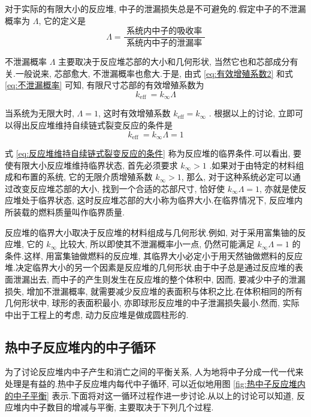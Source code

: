 \documentclass{Sichuan Normal University}
\begin{document}
对于实际的有限大小的反应堆, 中子的泄漏损失总是不可避免的.假定中子的不泄漏概率为 $\Lambda$, 它的定义是
\begin{equation}
    \Lambda=\frac{\text { 系统内中子的吸收率 }}{\text { 系统内中子的泄漏率 }}
    \label{eq:不泄漏概率}
\end{equation}

不泄漏概率 $\Lambda$ 主要取决于反应堆芯部的大小和几何形状, 当然它也和芯部成分有关.一般说来, 芯部愈大, 不泄漏概率也愈大.于是, 由式 \eqref{eq:有效增殖系数2} 和式 \eqref{eq:不泄漏概率} 可知, 有限尺寸芯部的有效增殖系数为
\begin{equation}
    k_{\text {eff }}=k_{\infty} \Lambda
    \label{eq:有效增殖系数3}
\end{equation}

当系统为无限大时, $\Lambda=1$, 这时有效增殖系数 $k_{\mathrm{eff}}=k_{\infty}$ .
根据以上的讨论, 立即可以得出反应堆维持自续链式裂变反应的条件是
\begin{equation}
    k_{\text {eff }}=k_{\infty} \Lambda=1
    \label{eq:反应堆维持自续链式裂变反应的条件}
\end{equation}

式 \eqref{eq:反应堆维持自续链式裂变反应的条件} 称为反应堆的临界条件.可以看出, 要使有限大小反应堆维持临界状态, 首先必须要求 $k_{\infty}>1$ .如果对于由特定的材料组成和布置的系统, 它的无限介质增殖系数 $k_{\infty}>1$, 那么, 对于这种系统必定可以通过改变反应堆芯部的大小, 找到一个合适的芯部尺寸, 恰好使 $k_{\infty} \Lambda=1$, 亦就是使反应堆处于临界状态, 这时反应堆芯部的大小称为临界大小.在临界情况下, 反应堆内所装载的燃料质量叫作临界质量.

反应堆的临界大小取决于反应堆的材料组成与几何形状.例如, 对于采用富集铀的反应堆, 它的 $k_{\infty}$ 比较大, 所以即使其不泄漏概率小一点, 仍然可能满足 $k_{\infty} \Lambda=1$ 的条件.这样, 用富集铀做燃料的反应堆, 其临界大小必定小于用天然铀做燃料的反应堆.决定临界大小的另一个因素是反应堆的几何形状.由于中子总是通过反应堆的表面泄漏出去, 而中子的产生则发生在反应堆的整个体积中, 因而, 要减少中子的泄漏损失, 增加不泄漏概率, 就需要减少反应堆的表面积与体积之比.在体积相同的所有几何形状中, 球形的表面积最小, 亦即球形反应堆的中子泄漏损失最小.然而, 实际中出于工程上的考虑, 动力反应堆是做成圆柱形的.
\subsection{热中子反应堆内的中子循环}
为了讨论反应堆内中子产生和消亡之间的平衡关系, 人为地将中子分成一代一代来处理是有益的.热中子反应堆内每代中子循环, 可以近似地用图 \ref{fig:热中子反应堆内的中子平衡} 表示.下面将对这一循环过程作进一步讨论.从以上的讨论可以知道, 反应堆内中子数目的增减与平衡, 主要取决于下列几个过程.
\end{document}

